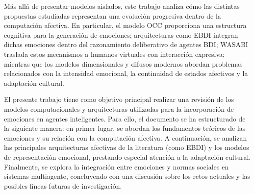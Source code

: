 Más allá de presentar modelos aislados, este trabajo analiza cómo las distintas propuestas estudiadas representan una evolución progresiva dentro de la computación afectiva. En particular, el modelo OCC proporciona una estructura cognitiva para la generación de emociones; arquitecturas como EBDI integran dichas emociones dentro del razonamiento deliberativo de agentes BDI; WASABI traslada estos mecanismos a humanos virtuales con interacción expresiva; mientras que los modelos dimensionales y difusos modernos abordan problemas relacionados con la intensidad emocional, la continuidad de estados afectivos y la adaptación cultural.

El presente trabajo tiene como objetivo principal realizar una revisión de los modelos computacionales y arquitecturas utilizadas para la incorporación de emociones en agentes inteligentes. Para ello, el documento se ha estructurado de la siguiente manera: en primer lugar, se abordan los fundamentos teóricos de las emociones y su relación con la computación afectiva. A continuación, se analizan las principales arquitecturas afectivas de la literatura (como EBDI) y los modelos de representación emocional, prestando especial atención a la adaptación cultural. Finalmente, se explora la integración entre emociones y normas sociales en sistemas multiagente, concluyendo con una discusión sobre los retos actuales y las posibles líneas futuras de investigación.